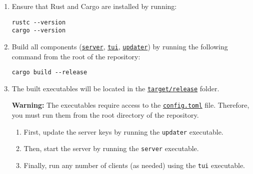 \begin{enumerate}
    \item Ensure that Rust and Cargo are installed by running:
    
        \begin{lstlisting}
rustc --version
cargo --version
        \end{lstlisting}
    
    \item Build all components (\href{https://github.com/christiansassi/advanced-programming-of-cryptographic-methods-project/tree/main/server}{\texttt{server}}, \href{https://github.com/christiansassi/advanced-programming-of-cryptographic-methods-project/tree/main/tui}{\texttt{tui}}, \href{https://github.com/christiansassi/advanced-programming-of-cryptographic-methods-project/tree/main/config}{\texttt{updater}}) by running the following command from the root of the repository:

        \begin{lstlisting}
cargo build --release
        \end{lstlisting}

    \item The built executables will be located in the \href{https://github.com/christiansassi/advanced-programming-of-cryptographic-methods-project/tree/main/target/release}{\texttt{target/release}} folder.
    
        \noindent
        \begin{myWarning}
        \textbf{Warning:} The executables require access to the \href{https://github.com/christiansassi/advanced-programming-of-cryptographic-methods-project/blob/main/config/config.toml}{\texttt{config.toml}} file. Therefore, you must run them from the root directory of the repository.
        \end{myWarning}

        \begin{enumerate}
            \item First, update the server keys by running the \texttt{updater} executable.
            \item Then, start the server by running the \texttt{server} executable.
            \item Finally, run any number of clients (as needed) using the \texttt{tui} executable.
        \end{enumerate}

\end{enumerate}
